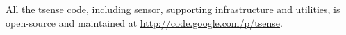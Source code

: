 All the tsense code, including sensor, supporting infrastructure and utilities, is open-source and maintained at \url{http://code.google.com/p/tsense}. 







